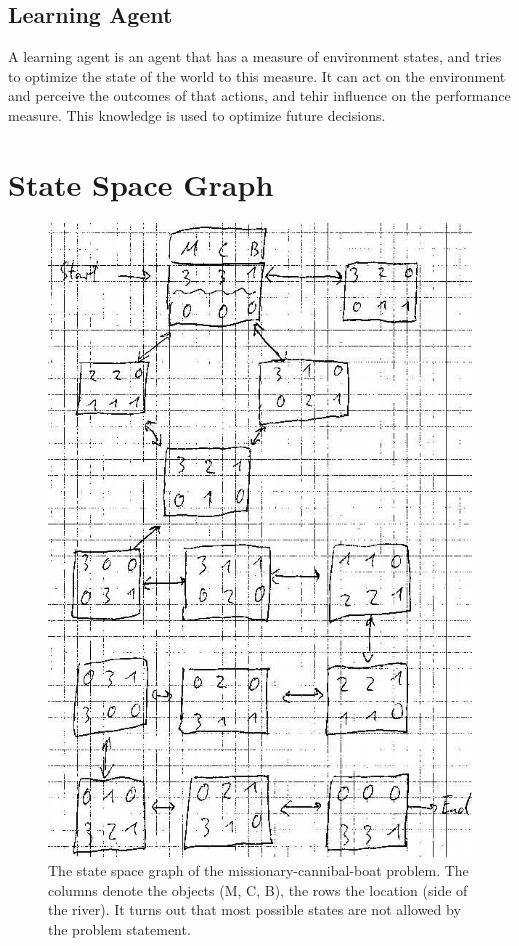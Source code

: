 \documentclass[11pt,a4paper]{scrartcl}
\begin{document}
\subsection{Learning Agent}\label{s:l-agent}
A learning agent is an agent that has a measure of environment states, and tries to optimize the state of the world to this measure. It can act on the environment and perceive the outcomes of that actions, and tehir influence 
on the performance measure. This knowledge is used to optimize future decisions. 


\newpage
\section{State Space Graph}

\begin{figure}[ht]
 \includegraphics[width=.65\linewidth]{missionaries_cropped.jpg}
 \caption{The state space graph of the missionary-cannibal-boat problem. The columns denote the objects (M, C, B), the rows the location (side of the river). It turns out that most possible states are not allowed by the problem statement.}
\end{figure}
\end{document}
